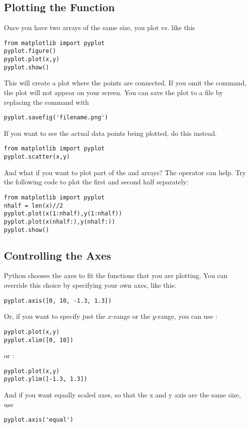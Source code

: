 \subsection*{Plotting the Function}
Once you have two arrays of the same size, you plot  vs.
 like this
\begin{Verbatim}
from matplotlib import pyplot
pyplot.figure()
pyplot.plot(x,y)
pyplot.show()
\end{Verbatim}
This will create a plot where the points are connected.  If you omit
the  command, the plot will not appear on your
screen.  You can save the plot to a file by replacing the
  command with
\begin{Verbatim}
pyplot.savefig('filename.png')
\end{Verbatim}
If you want to see the actual data points being plotted, do this
instead.
\begin{Verbatim}
from matplotlib import pyplot
pyplot.scatter(x,y)
\end{Verbatim}

 And what if you want to plot part
of the  and  arrays? The  operator can
help.  Try the following code to plot the first and second half
separately:
\begin{Verbatim}
from matplotlib import pyplot
nhalf = len(x)//2
pyplot.plot(x(1:nhalf),y(1:nhalf))
pyplot.plot(x(nhalf:),y(nhalf:))
pyplot.show()
\end{Verbatim}

\subsection*{Controlling the Axes}
\label{sec:Axes}
 Python chooses the axes to fit the functions
that you are plotting. You can override this choice by specifying
your own axes, like this:
\begin{Verbatim}
pyplot.axis([0, 10, -1.3, 1.3])
\end{Verbatim}
  Or, if you want to specify just the
$x$-range or the $y$-range, you can use :
\begin{Verbatim}
pyplot.plot(x,y)
pyplot.xlim([0, 10])
\end{Verbatim}
or :
\begin{Verbatim}
pyplot.plot(x,y)
pyplot.ylim([-1.3, 1.3])
\end{Verbatim}
And if you want equally scaled axes, so that the x and y axis are the same size, use
\begin{Verbatim}
pyplot.axis('equal')
\end{Verbatim}
 


